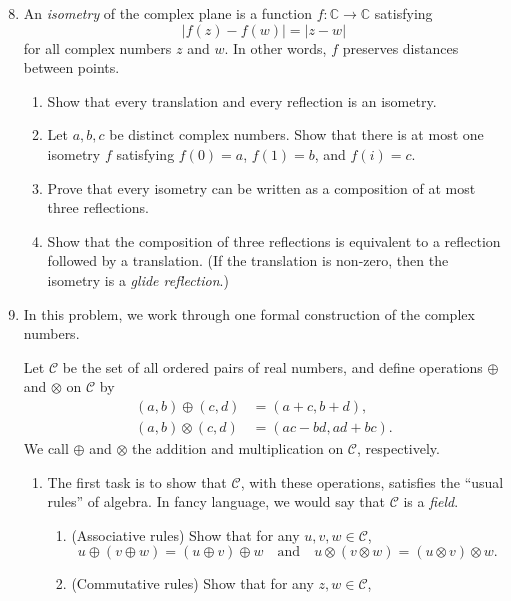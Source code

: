 \begin{enumerate}\setcounter{enumi}{7}
\item An \emph{isometry} of the complex plane is a function $f:\mathbb{C}\to\mathbb{C}$ satisfying
\begin{equation*}
\lvert f(z) - f(w)\rvert = \lvert z - w\rvert
\end{equation*}
for all complex numbers $z$ and $w$. In other words, $f$ preserves distances between points.
\begin{enumerate}
\item Show that every translation and every reflection is an isometry.
\item Let $a,b,c$ be distinct complex numbers. Show that there is at most one isometry $f$ satisfying $f(0) = a$, $f(1) = b$, and $f(i) = c$.
\item Prove that every isometry can be written as a composition of at most three reflections.
\item Show that the composition of three reflections is equivalent to a reflection followed by a translation. (If the translation is non-zero, then the isometry is a \emph{glide reflection}.)
\end{enumerate}
\item In this problem, we work through one formal construction of the complex numbers.\par 
Let $\mathcal{C}$ be the set of all ordered pairs of real numbers, and define operations $\oplus$ and $\otimes$ on $\mathcal{C}$ by
\begin{align*}
(a,b)\oplus (c,d) &= (a + c, b + d), \\
(a,b)\otimes (c,d) &= (ac - bd, ad + bc).
\end{align*}
We call $\oplus$ and $\otimes$ the addition and multiplication on $\mathcal{C}$, respectively.
\begin{enumerate}
\item The first task is to show that $\mathcal{C}$, with these operations, satisfies the ``usual rules'' of algebra. In fancy language, we would say that $\mathcal{C}$ is a \emph{field}.
\begin{enumerate}
\item (Associative rules) Show that for any $u,v,w\in\mathcal{C}$,
\begin{equation*}
u\oplus (v\oplus w) = (u\oplus v)\oplus w\quad\text{and}\quad u\otimes (v\otimes w) = (u\otimes v)\otimes w.
\end{equation*}
\item (Commutative rules) Show that for any $z,w\in\mathcal{C}$,

\end{enumerate}
\end{enumerate}
\end{enumerate}
